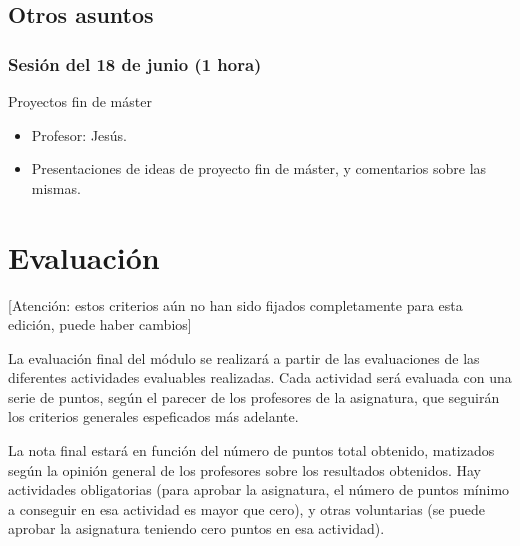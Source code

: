 \documentclass[a4paper,12pt]{article}
\begin{document}



\subsection{Otros asuntos}

\subsubsection{Sesión del 18 de junio (1 hora)}

Proyectos fin de máster

\begin{itemize}
\item Profesor: Jesús.
\item Presentaciones de ideas de proyecto fin de máster, y comentarios sobre las mismas.
\end{itemize}

\section{Evaluación}

[Atención: estos criterios aún no han sido fijados completamente para esta edición, puede haber cambios]

La evaluación final del módulo se realizará a partir de las evaluaciones de las diferentes actividades evaluables realizadas. Cada actividad será evaluada con una serie de puntos, según el parecer de los profesores de la asignatura, que seguirán los criterios generales espeficados más adelante.

La nota final estará en función del número de puntos total obtenido, matizados según la opinión general de los profesores sobre los resultados obtenidos. Hay actividades obligatorias (para aprobar la asignatura, el número de puntos mínimo a conseguir en esa actividad es mayor que cero), y otras voluntarias (se puede aprobar la asignatura teniendo cero puntos en esa actividad).
\end{document}
